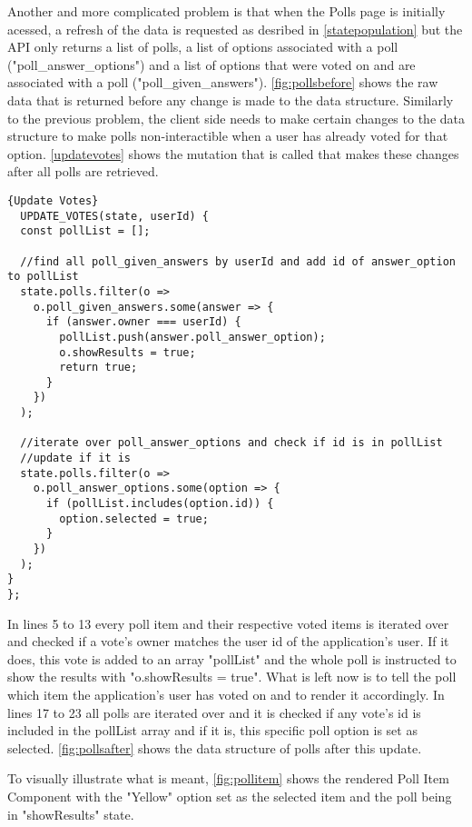 Another and more complicated problem is that when the Polls page is initially acessed, a refresh of the data is requested as desribed in \autoref{statepopulation} but the API only returns a list of polls, a list of options associated with a poll ("poll\_answer\_options") and a list of options that were voted on and are associated with a poll ("poll\_given\_answers"). \autoref{fig:pollsbefore} shows the raw data that is returned before any change is made to the data structure. Similarly to the previous problem, the client side needs to make certain changes to the data structure to make polls non-interactible when a user has already voted for that option. \autoref{updatevotes} shows the mutation that is called that makes these changes after all polls are retrieved. \newline

\begin{lstlisting}[caption=Update Votes, captionpos=b, style=htmlcssjs, label=updatevotes]{Update Votes}
  UPDATE_VOTES(state, userId) {
  const pollList = [];

  //find all poll_given_answers by userId and add id of answer_option to pollList
  state.polls.filter(o =>
    o.poll_given_answers.some(answer => {
      if (answer.owner === userId) {
        pollList.push(answer.poll_answer_option);
        o.showResults = true;
        return true;
      }
    })
  );

  //iterate over poll_answer_options and check if id is in pollList
  //update if it is
  state.polls.filter(o =>
    o.poll_answer_options.some(option => {
      if (pollList.includes(option.id)) {
        option.selected = true;
      }
    })
  );
}
};
\end{lstlisting}

In lines 5 to 13 every poll item and their respective voted items is iterated over and checked if a vote's owner matches the user id of the application's user. If it does, this vote is added to an array "pollList" and the whole poll is instructed to show the results with "o.showResults = true". What is left now is to tell the poll which item the application's user has voted on and to render it accordingly. In lines 17 to 23 all polls are iterated over and it is checked if any vote's id is included in the pollList array and if it is, this specific poll option is set as selected. \autoref{fig:pollsafter} shows the data structure of polls after this update.

To visually illustrate what is meant, \autoref{fig:pollitem} shows the rendered Poll Item Component with the "Yellow" option set as the selected item and the poll being in "showResults" state.

